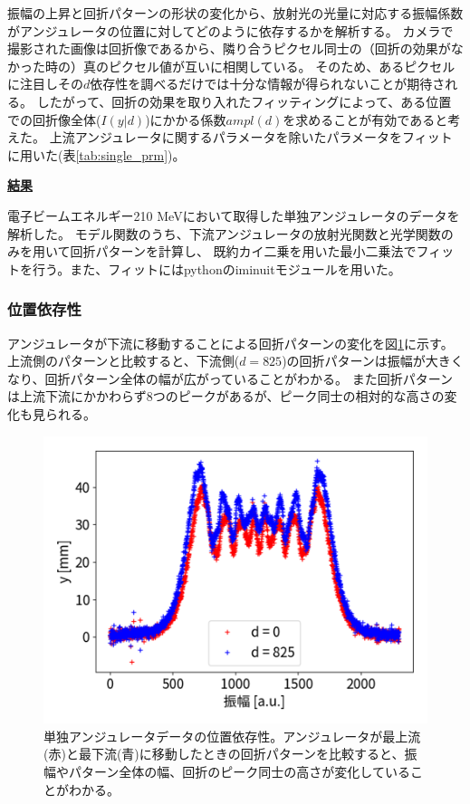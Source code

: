 \documentclass[a4paper,11pt,uplatex]{jsbook}
\begin{document}
振幅の上昇と回折パターンの形状の変化から、放射光の光量に対応する振幅係数がアンジュレータの位置に対してどのように依存するかを解析する。
カメラで撮影された画像は回折像であるから、隣り合うピクセル同士の（回折の効果がなかった時の）真のピクセル値が互いに相関している。
そのため、あるピクセルに注目しその$d$依存性を調べるだけでは十分な情報が得られないことが期待される。
したがって、回折の効果を取り入れたフィッティングによって、ある位置での回折像全体($I(y|d)$)にかかる係数$ampl(d)$を求めることが有効であると考えた。
上流アンジュレータに関するパラメータを除いたパラメータをフィットに用いた(表\ref{tab:single_prm})。

  

\noindent \textbf{\underline{結果}}\par
電子ビームエネルギー210 MeVにおいて取得した単独アンジュレータのデータを解析した。
モデル関数のうち、下流アンジュレータの放射光関数と光学関数のみを用いて回折パターンを計算し、
既約カイ二乗を用いた最小二乗法でフィットを行う。また、フィットにはpythonのiminuitモジュール\cite{iminuit}を用いた。
\subsubsection{位置依存性}
アンジュレータが下流に移動することによる回折パターンの変化を図\ref{DCposdep}に示す。上流側のパターンと比較すると、下流側($d= 825$)の回折パターンは振幅が大きくなり、回折パターン全体の幅が広がっていることがわかる。
また回折パターンは上流下流にかかわらず8つのピークがあるが、ピーク同士の相対的な高さの変化も見られる。
\begin{figure}[H]
  \centering
  \includegraphics[width=0.8\linewidth]{image/4-DCposdep.png}
  \caption[アンジュレータ位置依存性]{単独アンジュレータデータの位置依存性。アンジュレータが最上流(赤)と最下流(青)に移動したときの回折パターンを比較すると、振幅やパターン全体の幅、回折のピーク同士の高さが変化していることがわかる。}\label{DCposdep}
\end{figure}
\end{document}
